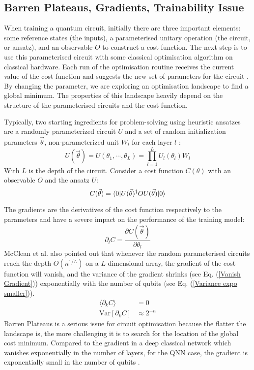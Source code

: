 \subsection{Barren Plateaus, Gradients, Trainability Issue}

When training a quantum circuit, initially there are three important elements: some reference states (the inputs), a parameterised unitary operation (the circuit, or ansatz), and an observable $O$ to construct a cost function.
The next step is to use this parameterised circuit with some classical optimisation algorithm on classical hardware.
Each run of the optimisation routine receives the current value of the cost function and suggests the new set of parameters for the circuit \cite{cerezo2021variational}.
By changing the parameter, we are exploring an optimisation landscape to find a global minimum.
The properties of this landscape heavily depend on the structure of the parameterised circuits and the cost function.

Typically, two starting ingredients for problem-solving using heuristic ansatzes are a randomly parameterized circuit $U$ and a set of random initialization parameters $\vec{\theta}$, non-parameterized unit $W_l$ for each layer $l$ \cite{mccleanBarrenPlateausQuantum2018}:
\begin{equation}\label{Parameterized Circuit}
    U(\vec{\theta})
    = U(\theta_1, \cdots, \theta_L)
    = \prod_{l=1}^L U_l(\theta_l)W_l
\end{equation}
With $L$ is the depth of the circuit. Consider a cost function $C(\theta)$ with an observable $O$ and the ansatz $U$:
\begin{equation}
    C(\vec{\theta})
    = \bra{0} U(\vec{\theta})^\dagger OU(\vec{\theta}) \ket{0}
\end{equation}

The gradients are the derivatives of the cost function respectively to the parameters and have a severe impact on the performance of the training model:
\begin{equation}
    \partial_l C = \frac{\partial C(\vec{\theta})}{\partial\theta_l}
\end{equation}
McClean et al. \cite{mccleanBarrenPlateausQuantum2018} also pointed out that whenever the random parameterised circuits reach the depth $O(n^{1/L})$ on a $L$-dimensional array, the gradient of the cost function will vanish, and the variance of the gradient shrinks (see Eq. (\ref{Vanish Gradient})) exponentially with the number of qubits (see Eq. (\ref{Variance expo smaller})).
\begin{align}
    \langle \partial_k C\rangle &= 0  \label{Vanish Gradient}\\
    \mathrm{Var}[\partial_k C] &\approx 2^{-n}  \label{Variance expo smaller}
\end{align}
Barren Plateaus is a serious issue for circuit optimisation because the flatter the landscape is, the more challenging it is to search for the location of the global cost minimum.
Compared to the gradient in a deep classical network which vanishes exponentially in the number of layers, for the QNN case, the gradient is exponentially small in the number of qubits \cite{mccleanBarrenPlateausQuantum2018}.

